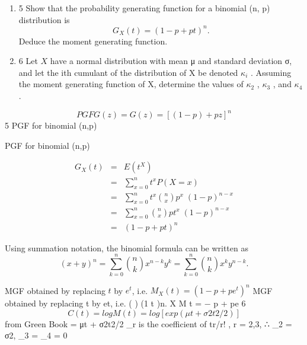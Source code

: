 \documentclass[a4paper,12pt]{article}
\begin{document}
\begin{enumerate}
\item 5 Show that the probability generating function for a binomial (n, p) distribution is
\[ G_X (t) = (1 − p + pt)^n .\]
Deduce the moment generating function. 
\item 6 Let $X$ have a normal distribution with mean μ and standard deviation σ, and let
the ith cumulant of the distribution of X be denoted $\kappa_i$ .
Assuming the moment generating function of X, determine the values of $\kappa_2$ , $\kappa_3$ ,
and $\kappa_4$ . 


\end{enumerate}
\newpage
\[PGF	G ( z ) = {\displaystyle G(z)=[(1-p)+pz]^{n}} \]
5 PGF for binomial (n,p)


PGF for binomial (n,p)


\begin{eqnarray*}
G_X(t) 
&=& E(t^X) \\ 
&=& \sum^{n}_{x=0} t^x P(X = x)  \\
&=& \sum^{n}_{x=0} t^x  {n \choose x} p^x \;(1-p)^{n-x} \\
&=& \sum^{n}_{x=0} {n \choose x} pt^x \;(1-p)^{n-x}\\
&=& (1 - p + pt)^{n}
\end{eqnarray*}


\begin{framed}
 Using summation notation, the binomial formula can be written as 
\[ {\displaystyle (x+y)^{n}=\sum _{k=0}^{n}{n \choose k}x^{n-k}y^{k}=\sum _{k=0}^{n}{n \choose k}x^{k}y^{n-k}.} \]
\end{framed}

MGF obtained by replacing $t$ by $e^t$, i.e. $M_X(t) = (1 - p + pe^t)^{n}$
MGF obtained by replacing t by et, i.e. ( ) (1 t )n.
X M t = − p + pe
6 \[C(t) = logM(t) = log[exp(μt + σ2t2/2)] \]from Green Book
= μt + σ2t2/2
\kappa_r is the coefficient of tr/r! , r = 2,3,
∴ \kappa_2 = σ2, \kappa_3 = \kappa_4 = 0
\end{document}
